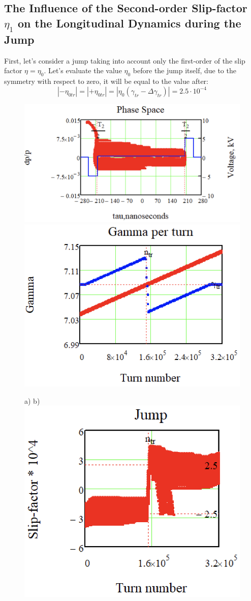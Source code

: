 \documentclass[a4paper]{jpconf}
\begin{document}
\subsection{The Influence of the Second-order Slip-factor  $\eta_{1}$ on the Longitudinal Dynamics during the Jump}

First, let's consider a jump taking into account only the first-order of the slip factor $\eta=\eta_{0}$. Let's evaluate the value $\eta_{0}$ before the jump itself, due to the symmetry with respect to zero, it will be equal to the value after:
$$
\left|-\eta_{0 t r}\right|=\left|+\eta_{0 t r}\right|=\left|\eta_{0}\left(\gamma_{t r}-\Delta \gamma_{t r}\right)\right|=2.5 \cdot 10^{-4}
$$

\begin{figure}[!htb]
   \centering
   \includegraphics*[width=.56\columnwidth]{img/WEPOPT004_f4-1}
   \includegraphics*[width=.43\columnwidth]{img/WEPOPT004_f4-2}\\
   \par \hspace{1.4cm} a)      \hspace{7.3cm} b)\\
   \includegraphics*[width=.50\columnwidth]{img/WEPOPT004_f4-3}

\end{figure}
\end{document}
